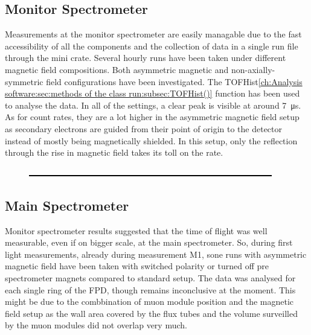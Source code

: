   \subsection{Monitor Spectrometer}
  \label{ch:Analysis:sec:Monitor Spectrometer Measurements:subsec:Monitor Spectrometer}
  
  Measurements at the monitor spectrometer are easily managable due to the fast accessibility of all the components and the collection of data in a single run file through the mini crate.
  Several hourly runs have been taken under different magnetic field compositions. Both asymmetric magnetic  and non-axially-symmetric field configurations have been investigated. The TOFHist\ref{ch:Analysis software:sec:methods of the class run:subsec:TOFHist()} function has been used to analyse the data. In all of the settings, a clear peak is visible at around \SI{7}{\micro\second}. As for count rates, they are a lot higher in the asymmetric magnetic field setup as secondary electrons are guided from their point of origin to the detector instead of mostly being magnetically shielded. In this setup, only the reflection through the rise in magnetic field takes its toll on the rate.
  
  \begin{figure}
  	\includegraphics{graphics/dummy.eps}
  \end{figure}

  \subsection{Main Spectrometer}
  \label{ch:Analysis:sec:Monitor Spectrometer Measurements:subsec:Main Spectrometer}
  
  Monitor spectrometer results suggested that the time of flight was well measurable, even if on bigger scale, at the main spectrometer. So, during first light measurements, already during measurement M1, sone runs with asymmetric magnetic field have been taken with switched polarity or turned off pre spectrometer magnets compared to standard setup.
  The data was analysed for each single ring of the FPD, though remains inconclusive at the moment. This might be due to the combbination of muon module position and the magnetic field setup as the wall area covered by the flux tubes and the volume surveilled by the muon modules did not overlap very much.
  
